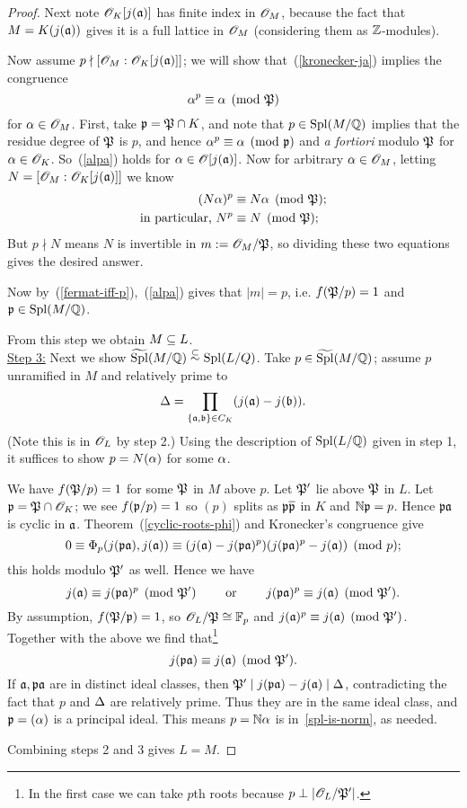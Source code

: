 \begin{proof}
Next note $\mathscr{O}_K[j(\mathfrak{a})]$ has finite index in $\mathscr{O}_M$, because the fact that $M=K(j(\mathfrak{a}))$ gives it is a full lattice in $\mathscr{O}_M$ (considering them as $\mathbb{Z}$-modules).

Now assume $p\nmid [\mathscr{O}_M:\mathscr{O}_K[j(\mathfrak{a})]]$; we will show that~(\ref{kronecker-ja}) implies the congruence
\begin{equation}\label{alpa}
\alpha^p\equiv \alpha\pmod{\mathfrak{P}}
\end{equation}
for $\alpha\in \mathscr{O}_M$. First, take $\mathfrak{p}=\mathfrak{P}\cap K$, and note that $p\in \operatorname{Spl}(M/\mathbb{Q})$ implies that the residue degree of $\mathfrak{P}$ is $p$, and hence $\alpha^p\equiv \alpha\pmod{\mathfrak{p}}$ and {\it a fortiori} modulo $\mathfrak{P}$ for $\alpha\in \mathscr{O}_K$. So~(\ref{alpa}) holds for $\alpha\in \mathscr{O}[j(\mathfrak{a})]$. Now for arbitrary $\alpha\in \mathscr{O}_M$, letting $N=[\mathscr{O}_M:\mathscr{O}_K[j(\mathfrak{a})]]$ we know 
\begin{align*}
(N\alpha)^p&\equiv N\alpha\pmod{\mathfrak{P}};\\
\text{in particular, }N^p&\equiv N\pmod{\mathfrak{P}};
\end{align*}
But $p\nmid N$ means $N$ is invertible in $m:=\mathscr{O}_M/\mathfrak{P}$, so dividing these two equations gives the desired answer.

Now by~(\ref{fermat-iff-p}),~(\ref{alpa}) gives that $|m|=p$, i.e. $f(\mathfrak{P}/p)=1$ and $\mathfrak{p}\in \operatorname{Spl}(M/\mathbb{Q})$.

From this step we obtain $M\subseteq L$.\\

\noindent\underline{Step 3:}
Next we show $\widetilde{\operatorname{Spl}}(M/\mathbb{Q})\stackrel{\subset}{\sim} \operatorname{Spl}(L/Q)$. Take $p\in \widetilde{\operatorname{Spl}}(M/\mathbb{Q})$; assume $p$ unramified in $M$ and relatively prime to
\[
\Delta=\prod_{\{\mathfrak{a},\mathfrak{b}\}\in C_K}(j(\mathfrak{a})-j(\mathfrak{b})).
\]
(Note this is in $\mathscr{O}_L$ by step 2.)
Using the description of $\operatorname{Spl}(L/\mathbb{Q})$ given in step 1, it suffices to show $p=N(\alpha)$ for some $\alpha$. 

We have $f(\mathfrak{P}/p)=1$ for some $\mathfrak{P}$ in $M$ above $p$. Let $\mathfrak{P}'$ lie above $\mathfrak{P}$ in $L$. Let $\mathfrak{p}=\mathfrak{P}\cap \mathscr{O}_K$; we see $f(\mathfrak{p}/p)=1$ so $(p)$ splits as $\mathfrak{p}\overline{\mathfrak{p}}$ in $K$ and $\mathbb{N}\mathfrak{p}=p$. Hence $\mathfrak{p}\mathfrak{a}$ is cyclic in $\mathfrak{a}$. Theorem~(\ref{cyclic-roots-phi}) and Kronecker's congruence give
\[
0\equiv \Phi_p(j(\mathfrak{p}\mathfrak{a}),j(\mathfrak{a}))\equiv (j(\mathfrak{a})-j(\mathfrak{p}\mathfrak{a})^p)(j(\mathfrak{p}\mathfrak{a})^p-j(\mathfrak{a}))\pmod{p};
\]
this holds modulo $\mathfrak{P}'$ as well. 
Hence we have
\[
j(\mathfrak{a})\equiv j(\mathfrak{p}\mathfrak{a})^p\pmod{\mathfrak{P}'}\qquad\text{ or }\qquad
j(\mathfrak{p}\mathfrak{a})^p\equiv j(\mathfrak{a})\pmod{\mathfrak{P}'}.
\]
By assumption, $f(\mathfrak{P}/\mathfrak{p})=1$, so $\mathscr{O}_L/\mathfrak{P}\cong \mathbb{F}_p$ and $j(\mathfrak{a})^p\equiv j(\mathfrak{a})\pmod{\mathfrak{P}'}$. Together with the above we find that\footnote{In the first case we can take $p$th roots because $p\perp |\mathscr{O}_L/\mathfrak{P}'|$.}
\[
j(\mathfrak{p}\mathfrak{a})\equiv j(\mathfrak{a})\pmod{\mathfrak{P}'}.
\]
If $\mathfrak{a},\mathfrak{p}\mathfrak{a}$ are in distinct ideal classes, then $\mathfrak{P}'\mid j(\mathfrak{p}\mathfrak{a})-j(\mathfrak{a})\mid \Delta$, contradicting the fact that $p$ and $\Delta$ are relatively prime. Thus they are in the same ideal class, and $\mathfrak{p}=(\alpha)$ is a principal ideal. This means $p=\mathbb{N}\alpha$ is in~\ref{spl-is-norm}, as needed.

Combining steps 2 and 3 gives $L=M$.
\end{proof}
